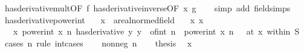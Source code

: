 \begin{isabellebody}
%
\isatagproof
{}\isamarkupfalse%
\ has{\isacharunderscore}{\kern0pt}derivative{\isacharunderscore}{\kern0pt}mult{\isacharbrackleft}{\kern0pt}OF\ f\ has{\isacharunderscore}{\kern0pt}derivative{\isacharunderscore}{\kern0pt}inverse{\isacharbrackleft}{\kern0pt}OF\ x\ g{\isacharbrackright}{\kern0pt}{\isacharbrackright}{\kern0pt}\isanewline
\ \ \isamarkupfalse%
\ {\isacharparenleft}{\kern0pt}simp\ add{\isacharcolon}{\kern0pt}\ field{\isacharunderscore}{\kern0pt}simps{\isacharparenright}{\kern0pt}%
\endisatagproof
{\isafoldproof}%
%
\isadelimproof
\isanewline
%
\endisadelimproof
\isanewline
{}\isamarkupfalse%
\ has{\isacharunderscore}{\kern0pt}derivative{\isacharunderscore}{\kern0pt}power{\isacharunderscore}{\kern0pt}int{\isacharprime}{\kern0pt}{\isacharcolon}{\kern0pt}\isanewline
\ \ \ x\ {\isacharcolon}{\kern0pt}{\isacharcolon}{\kern0pt}\ {\isachardoublequoteopen}{\isacharprime}{\kern0pt}a{\isacharcolon}{\kern0pt}{\isacharcolon}{\kern0pt}real{\isacharunderscore}{\kern0pt}normed{\isacharunderscore}{\kern0pt}field{\isachardoublequoteclose}\isanewline
\ \ \ x{\isacharcolon}{\kern0pt}\ {\isachardoublequoteopen}x\ {\isasymnoteq}\ {}{\isachardoublequoteclose}\isanewline
\ \ \ {\isachardoublequoteopen}{\isacharparenleft}{\kern0pt}{\isacharparenleft}{\kern0pt}{\isasymlambda}x{\isachardot}{\kern0pt}\ power{\isacharunderscore}{\kern0pt}int\ x\ n{\isacharparenright}{\kern0pt}\ has{\isacharunderscore}{\kern0pt}derivative\ {\isacharparenleft}{\kern0pt}{\isasymlambda}y{\isachardot}{\kern0pt}\ y\ {\isacharasterisk}{\kern0pt}\ {\isacharparenleft}{\kern0pt}of{\isacharunderscore}{\kern0pt}int\ n\ {\isacharasterisk}{\kern0pt}\ power{\isacharunderscore}{\kern0pt}int\ x\ {\isacharparenleft}{\kern0pt}n\ {\isacharminus}{\kern0pt}\ {}{\isacharparenright}{\kern0pt}{\isacharparenright}{\kern0pt}{\isacharparenright}{\kern0pt}{\isacharparenright}{\kern0pt}\ {\isacharparenleft}{\kern0pt}at\ x\ within\ S{\isacharparenright}{\kern0pt}{\isachardoublequoteclose}\isanewline
%
\isadelimproof
%
\endisadelimproof
%
\isatagproof
{}\isamarkupfalse%
\ {\isacharparenleft}{\kern0pt}cases\ n\ rule{\isacharcolon}{\kern0pt}\ int{\isacharunderscore}{\kern0pt}cases{}{\isacharparenright}{\kern0pt}\isanewline
\ \ \isamarkupfalse%
\ {\isacharparenleft}{\kern0pt}nonneg\ n{\isacharparenright}{\kern0pt}\isanewline
\ \ \isamarkupfalse%
\ {\isacharquery}{\kern0pt}thesis\ \isamarkupfalse%
\ x\isanewline
\ \ \ \ \isamarkupfalse%

\end{isabellebody}
